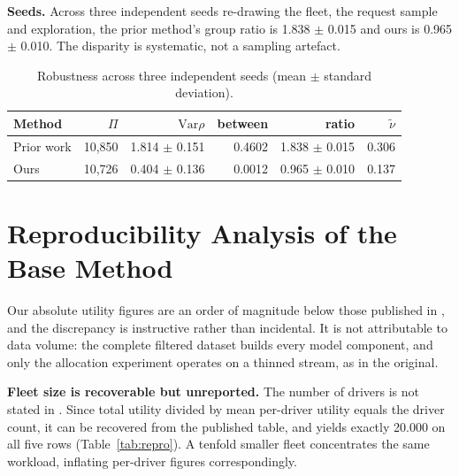 \documentclass[10pt,twocolumn]{article}
\begin{document}
\textbf{Seeds.} Across three independent seeds re-drawing the fleet, the request sample and exploration, the prior method's group ratio is 1.838 \(\pm\) 0.015 and ours is 0.965 \(\pm\) 0.010. The disparity is systematic, not a sampling artefact.

\begin{table}[t]
\centering
\caption{Robustness across three independent seeds (mean \(\pm\) standard deviation).}
\label{tab:seeds}
\small
\begin{tabular}{lrrrrr}
\toprule
Method & \(\Pi\) & \(\mathrm{Var}\rho\) & between & ratio & \(\tilde{\nu}\) \\
\midrule
Prior work & 10,850 & 1.814 \(\pm\) 0.151 & 0.4602 & 1.838 \(\pm\) 0.015 & 0.306 \\
Ours & 10,726 & 0.404 \(\pm\) 0.136 & 0.0012 & 0.965 \(\pm\) 0.010 & 0.137 \\
\bottomrule
\end{tabular}
\end{table}
\section{Reproducibility Analysis of the Base Method}
Our absolute utility figures are an order of magnitude below those published in \cite{kang2024}, and the discrepancy is instructive rather than incidental. It is not attributable to data volume: the complete filtered dataset builds every model component, and only the allocation experiment operates on a thinned stream, as in the original.

\textbf{Fleet size is recoverable but unreported.} The number of drivers is not stated in \cite{kang2024}. Since total utility divided by mean per-driver utility equals the driver count, it can be recovered from the published table, and yields exactly 20.000 on all five rows (Table~\ref{tab:repro}). A tenfold smaller fleet concentrates the same workload, inflating per-driver figures correspondingly.
\end{document}
